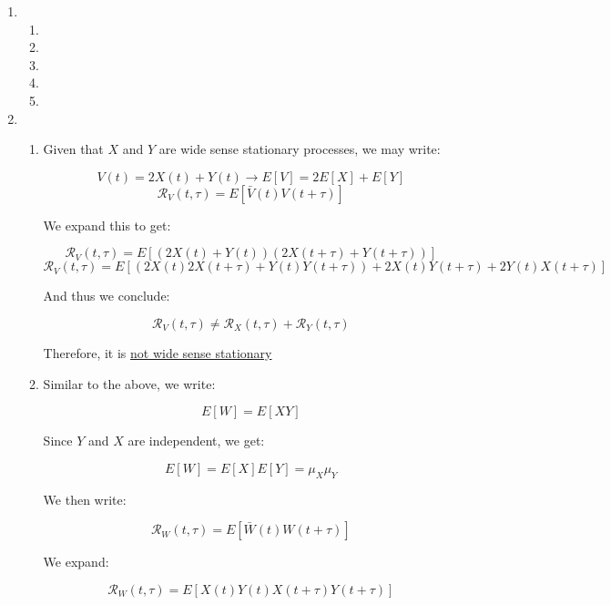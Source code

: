 \begin{enumerate}
\begin{enumerate}
    \end{enumerate}

  \item

    \begin{enumerate}

      \item 

      \item 

      \item 

      \item 

      \item 

    \end{enumerate}

  \item

    \begin{enumerate}

      \item Given that $X$ and $Y$ are wide sense stationary processes, we may write:

        $$V(t)=2X(t)+Y(t)\to E[V]=2E[X]+E[Y]$$
        $$\mathcal{R}_V(t,\tau)=E[\bar{V}(t)V(t+\tau)]$$

        We expand this to get:

        $$\mathcal{R}_V(t,\tau)=E[(2X(t)+Y(t))(2X(t+\tau)+Y(t+\tau))]$$
        $$\mathcal{R}_V(t,\tau)=E[(2X(t)2X(t+\tau)+Y(t)Y(t+\tau))+2X(t)Y(t+\tau)+2Y(t)X(t+\tau)]$$

        And thus we conclude:

        $$\boxed{\mathcal{R}_V(t,\tau)\neq \mathcal{R}_X(t,\tau)+\mathcal{R}_Y(t,\tau)}$$

        Therefore, it is \underline{not wide sense stationary}

      \item Similar to the above, we write:

        $$E[W]=E[XY]$$

        Since $Y$ and $X$ are independent, we get:

        $$E[W]=E[X]E[Y]=\mu_X\mu_Y$$

        We then write:

        $$\mathcal{R}_W(t,\tau)=E[\bar{W}(t)W(t+\tau)]$$

        We expand:

        $$\mathcal{R}_W(t,\tau)=E[X(t)Y(t)X(t+\tau)Y(t+\tau)]$$


\end{enumerate}
\end{enumerate}
